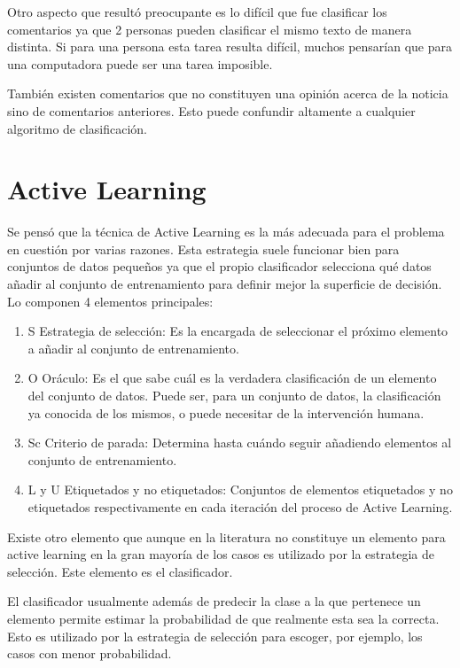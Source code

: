 \documentclass[]{article}
\begin{document}
Otro aspecto que resultó preocupante es lo difícil que fue clasificar los comentarios ya que 2 personas pueden clasificar el mismo texto de manera distinta. Si para una persona esta tarea resulta difícil, muchos pensarían que para una computadora puede ser una tarea imposible.

También existen comentarios que no constituyen una opinión acerca de la noticia sino de comentarios anteriores. Esto puede confundir altamente a cualquier algoritmo de clasificación.

\section{Active Learning}
Se pensó que la técnica de Active Learning es la más adecuada para el problema en cuestión por varias razones. Esta estrategia suele funcionar bien para conjuntos de datos pequeños ya que el propio clasificador selecciona qué datos añadir al conjunto de entrenamiento para definir mejor la superficie de decisión. Lo componen 4 elementos principales:

\begin{enumerate}
    \item S Estrategia de selección: Es la encargada de seleccionar el próximo elemento a añadir al conjunto de entrenamiento.
    \item O Oráculo: Es el que sabe cuál es la verdadera clasificación de un elemento del conjunto de datos. Puede ser, para un conjunto de datos, la clasificación ya conocida de los mismos, o puede necesitar de la intervención humana.
    \item Sc Criterio de parada: Determina hasta cuándo seguir añadiendo elementos al conjunto de entrenamiento.
    \item L y U Etiquetados y no etiquetados: Conjuntos de elementos etiquetados y no etiquetados respectivamente en cada iteración del proceso de Active Learning.
\end{enumerate}

Existe otro elemento que aunque en la literatura no constituye un elemento para active learning en la gran mayoría de los casos es utilizado por la estrategia de selección. Este elemento es el clasificador. 

El clasificador usualmente además de predecir la clase a la que pertenece un elemento permite estimar la probabilidad de que realmente esta sea la correcta. Esto es utilizado por la estrategia de selección para escoger, por ejemplo, los casos con menor probabilidad.
\end{document}
